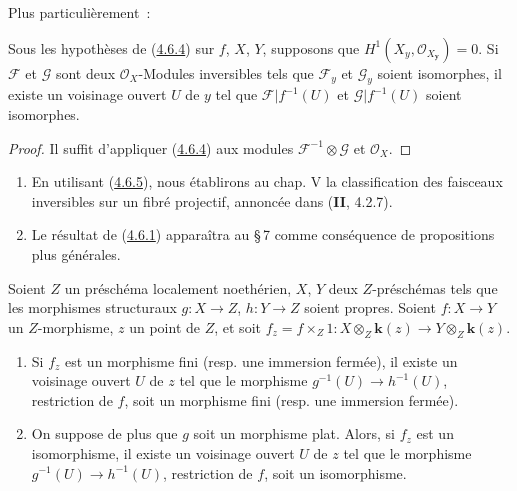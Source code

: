 Plus particulièrement~:

\begin{corollary}[4.6.5]
\label{III.4.6.5-fr}
Sous les hypothèses de \textup{(\hyperref[III.4.6.4-fr]{4.6.4})} sur $f$, $X$, $Y$,
supposons que $H^1(X_y,\mathcal O_{X_{\boldsymbol{y}}})=0$. Si $\mathcal F$ et $\mathcal G$
sont deux $\mathcal O_X$-Modules inversibles tels que $\mathcal F_y$ et
$\mathcal G_y$ soient isomorphes, il existe un voisinage ouvert $U$ de $y$
tel que $\mathcal F|f^{-1}(U)$ et $\mathcal G|f^{-1}(U)$ soient isomorphes.
\end{corollary}

\begin{proof}
Il suffit d'appliquer (\hyperref[III.4.6.4-fr]{4.6.4}) aux modules
$\mathcal F^{-1}\otimes\mathcal G$ et $\mathcal O_X$.
\end{proof}

\begin{remarks}[4.6.6]
\label{III.4.6.6-fr}
\begin{enumerate}
\item[(i)] En utilisant (\hyperref[III.4.6.5-fr]{4.6.5}), nous établirons au
chap. V la classification des faisceaux inversibles sur un fibré projectif,
annoncée dans (\textbf{II}, 4.2.7).
\item[(ii)] Le résultat de (\hyperref[III.4.6.1-fr]{4.6.1}) apparaîtra au
\S\,7 comme conséquence de propositions plus générales.
\end{enumerate}
\end{remarks}

\begin{proposition}[4.6.7]
\label{III.4.6.7-fr}
Soient $Z$ un préschéma localement noethérien, $X$, $Y$ deux $Z$-préschémas
tels que les morphismes structuraux $g:X\to Z$, $h:Y\to Z$ soient propres.
Soient $f:X\to Y$ un $Z$-morphisme, $z$ un point de $Z$, et soit
$f_z=f\times_Z1:
X\otimes_Z\boldsymbol{k}(z)\longrightarrow Y\otimes_Z\boldsymbol{k}(z)$.
\begin{enumerate}
\item[\textup{(i)}] Si $f_z$ est un morphisme fini \textup{(resp.} une immersion fermée), il
existe un voisinage ouvert $U$ de $z$ tel que le morphisme
$g^{-1}(U)\to h^{-1}(U)$, restriction de $f$, soit un morphisme fini \textup{(resp.}
une immersion fermée).
\item[\textup{(ii)}] On suppose de plus que $g$ soit un morphisme plat. Alors, si
$f_z$ est un isomorphisme, il existe un voisinage ouvert $U$ de $z$ tel que
le morphisme $g^{-1}(U)\to h^{-1}(U)$, restriction de $f$, soit un
isomorphisme.
\end{enumerate}
\end{proposition}

